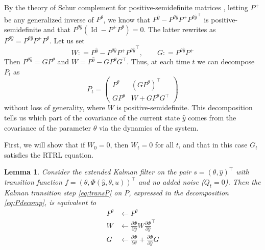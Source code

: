 \documentclass[11pt,a4paper]{article}
\newcommand{\deq}{\mathrel{\mathop{:}}=}
\DeclareMathOperator{\Id}{Id}
\newcommand{\1}{\mathbbm{1}}
\theoremstyle{yannthm}
\newtheorem{lem}[defi]{Lemma}
\theoremstyle{yannthm2}
\newcommand{\transp}[1]{#1^{\!\top}\!}
\newcommand{\Ptheta}{P^\theta}
\newcommand{\Py}{P^{\hat y}}
\newcommand{\Pthetay}{P^{\theta\hat y}}
\newcommand{\transf}{\Phi}
\numberwithin{equation}{section}
\begin{document}
By the theory of Schur complement for positive-semidefinite matrices
\cite[Appendix A.5.5]{BVconvopt},
letting $P^+$ be any generalized inverse of $\Ptheta$, we know that
$\Py-\Pthetay P^+\transp{{\Pthetay}}$ is positive-semidefinite and that
$\Pthetay (\Id-P^+\Ptheta)=0$. The latter rewrites as $\Pthetay=\Pthetay
P^+ \Ptheta$. Let us set 
\begin{equation}
W\deq \Py-\Pthetay
P^+\transp{{\Pthetay}}, \qquad G\deq \Pthetay P^+
\end{equation}
Then
$\Pthetay=G\Ptheta$ and $W=\Py-G\Ptheta \transp{G}$. Thus, at each time $t$ we can decompose $P_t$
as
\begin{equation}
\label{eq:Pdecomp}
P_t=
\begin{pmatrix}
\Ptheta & \transp{(G\Ptheta)}
\\ G\Ptheta & W+G\Ptheta \transp{G}
\end{pmatrix}
\end{equation}
without loss of generality, where $W$ is positive-semidefinite. This decomposition tells us which part of the
covariance of the current state $\hat y$ comes from the covariance of the
parameter $\theta$ via the dynamics of the system.

First, we will show that if $W_0=0$, then $W_t=0$ for all $t$, and that
in this case $G_t$ satisfies the RTRL equation.

\begin{lem}
\label{lem:transdecomp}
Consider the extended Kalman filter on the pair $s=\transp{(\theta, \hat
y)}$ with
transition function $f=\transp{(\theta,\transf(\hat y,\theta,u))}$ and no
added noise ($Q_t=0$). Then the Kalman transition step
\eqref{eq:transP} on $P$, expressed in the decomposition
\eqref{eq:Pdecomp}, is
equivalent to
\begin{align}
\Ptheta &\gets \Ptheta
\\
W&\gets \frac{\partial \transf}{\partial \hat
y}W\transp{\frac{\partial \transf}{\partial \hat y}}
\label{eq:transW}
\\
G&\gets \frac{\partial \transf}{\partial \theta}+\frac{\partial
\transf}{\partial \hat y}G
\end{align}
\end{lem}
\end{document}
